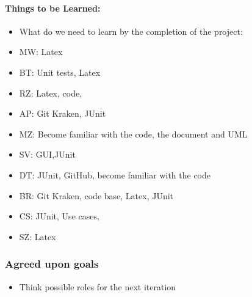 \documentclass[10pt, a4paper]{article}
\begin{document}
			\paragraph{Things to be Learned:}
			\begin{itemize}
				\item What do we need to learn by the completion of the project: 
				\item MW: Latex 
				\item BT: Unit tests, Latex 
				\item RZ: Latex, code, 
				\item AP: Git Kraken, JUnit 
				\item MZ: Become familiar with the code, the document and UML 
				\item SV: GUI,JUnit
				\item DT: JUnit, GitHub, become familiar with the code
				\item BR: Git Kraken, code base, Latex, JUnit 
				\item CS: JUnit, Use cases,
				\item SZ: Latex 
			\end{itemize}
			
			\subsubsection{Agreed upon goals}
			
			\begin{itemize}
				\item Think possible roles for the next iteration 
				
			\end{itemize}
			\pagebreak
			
	
\end{document}
